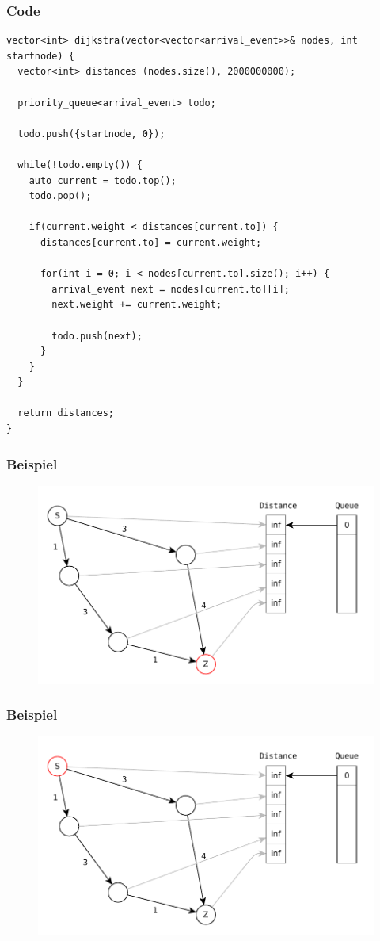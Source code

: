 \begin{frame}[fragile]
\frametitle{Code}
\begin{lstlisting}[basicstyle=\tiny]
vector<int> dijkstra(vector<vector<arrival_event>>& nodes, int startnode) {
  vector<int> distances (nodes.size(), 2000000000);

  priority_queue<arrival_event> todo;

  todo.push({startnode, 0});

  while(!todo.empty()) {
    auto current = todo.top();
    todo.pop();

    if(current.weight < distances[current.to]) {
      distances[current.to] = current.weight;

      for(int i = 0; i < nodes[current.to].size(); i++) {
        arrival_event next = nodes[current.to][i];
        next.weight += current.weight;

        todo.push(next);
      }
    }
  }

  return distances;
}
\end{lstlisting}

\end{frame}


\begin{frame}
\frametitle{Beispiel}
\begin{figure}
\includegraphics[scale=.8]{dijkstra_graphs/dijkstra_0.pdf}
\end{figure}
\end{frame}

\begin{frame}
\frametitle{Beispiel}
\begin{figure}
\includegraphics[scale=.8]{dijkstra_graphs/dijkstra_1.pdf}
\end{figure}
\end{frame}

